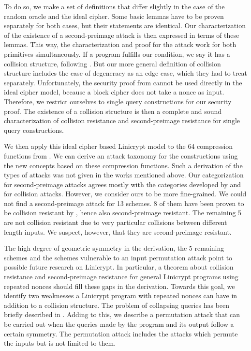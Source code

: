 To do so, we make a set of definitions that differ slightly in the case of the random oracle and the ideal cipher.
Some basic lemmas have to be proven separately for both cases, but their statements are identical.
Our characterization of the existence of a second-preimage attack is then expressed in terms of these lemmas.
This way, the characterization and proof for the attack work for both primitives simultaneously.
If a program fulfills our condition, we say it has a collision structure, following \cite{TCC:McQSwoRos19}.
But our more general definition of collision structure includes the case of degeneracy as an edge case,
which they had to treat separately.
Unfortunately, the security proof from \cite{TCC:McQSwoRos19} cannot be used directly in the ideal cipher model,
because a block cipher does not take a nonce as input.
Therefore, we restrict ourselves to single query constructions for our security proof.
The existence of a collision structure is then a complete and sound characterization of collision resistance and second-preimage resistance for single query constructions.

We then apply this ideal cipher based Linicrypt model to the 64 compression functions from \cite{C:PreGovVan93}.
We can derive an attack taxonomy for the \MD constructions using the new concepts based on these compression functions.
Such a derivation of the types of attacks was not given in the works mentioned above.
Our categorization for second-preimage attacks agrees mostly with the categories developed by \cite{C:PreGovVan93} and \cite{C:BlaRogShr02} for collision attacks.
However, we consider ours to be more fine-grained.
We could not find a second-preimage attack for 13 schemes.
8 of them have been proven to be collision resistant by \cite{C:BlaRogShr02},
hence also second-preimage resistant.
The remaining 5 are not collision resistant due to very particular collisions between different length inputs.
We suspect, however, that they are second-preimage resistant.

The high degree of geometric symmetry in the derivation,
the 5 remaining schemes and the schemes vulnerable to an input permutation attack point to possible future research on Linicrypt.
In particular,
a theorem about collision resistance and second-preimage resistance for general Linicrypt programs using repeated nonces should fill these gaps in the derivation.
Towards this goal, we identify two weaknesses a Linicrypt program with repeated nonces can have in addition to a collision structure.
The problem of collapsing queries has been briefly described in \cite{TCC:McQSwoRos19}.
Adding to this, we describe a permutation attack that can be carried out when the queries made by the program and its output follow a certain symmetry.
The permutation attack includes the attacks which permute the inputs but is not limited to them.